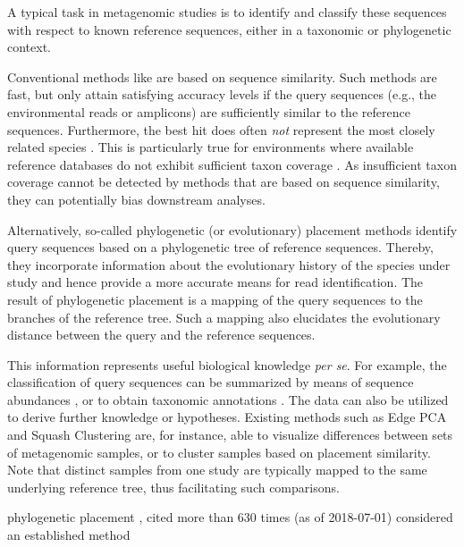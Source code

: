 A typical task in metagenomic studies is to identify and classify these sequences with respect
to known reference sequences, either in a taxonomic or phylogenetic context.

Conventional methods like  \cite{Altschul1990} are based on sequence similarity.
Such methods are fast, but only attain satisfying accuracy levels
if the query sequences (e.g., the environmental reads or amplicons) are sufficiently similar to the reference sequences.
Furthermore, the best  hit does often \emph{not} represent the most closely related species \cite{Koski2001}.
This is particularly true for environments where available reference databases
do not exhibit sufficient taxon coverage \citep{Mahe2017}.
As insufficient taxon coverage cannot be detected by methods that are based on sequence similarity,
they can potentially bias downstream analyses.

Alternatively, so-called phylogenetic (or evolutionary) placement methods \cite{Matsen2010,Berger2011,Barbera2018}
identify query sequences based on a phylogenetic tree of reference sequences.
Thereby, they incorporate information about the evolutionary history of the species under study
and hence provide a more accurate means for read identification.
The result of phylogenetic placement is a mapping of the query sequences to the branches of the reference tree.
Such a mapping also elucidates the evolutionary distance between the query and the reference sequences.

This information represents useful biological knowledge \emph{per se}.
For example, the classification of query sequences can be summarized by means of sequence abundances \cite{Pace1997,Hugenholtz1998},
or to obtain taxonomic annotations \cite{Kozlov2016}.
The data can also be utilized to derive further knowledge or hypotheses.
Existing methods such as Edge PCA and Squash Clustering \cite{Matsen2011a} are, for instance, able
to visualize differences between sets of metagenomic samples,
or to cluster samples based on placement similarity.
Note that distinct samples from one study are typically mapped to the same underlying reference tree,
thus facilitating such comparisons.



phylogenetic placement \cite{Matsen2010,Berger2011,Barbera2018}, cited more than 630 times (as of 2018-07-01)
considered an established method

